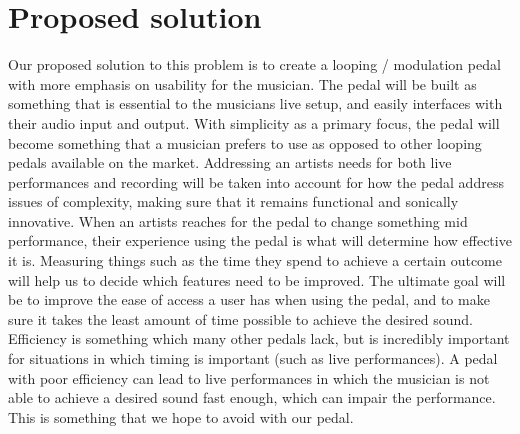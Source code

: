 \documentclass{article}
\begin{document}
\section{Proposed solution}
Our proposed solution to this problem is to create a looping / modulation pedal with more emphasis on usability for the musician. The pedal will be built as something that is essential to the musicians live setup, and easily interfaces with their audio input and output. With simplicity as a primary focus, the pedal will become something that a musician prefers to use as opposed to other looping pedals available on the market. Addressing an artists needs for both live performances and recording will be taken into account for how the pedal address issues of complexity, making sure that it remains functional and sonically innovative. When an artists reaches for the pedal to change something mid performance, their experience using the pedal is what will determine how effective it is. Measuring things such as the time they spend to achieve a certain outcome will help us to decide which features need to be improved. The ultimate goal will be to improve the ease of access a user has when using the pedal, and to make sure it takes the least amount of time possible to achieve the desired sound. Efficiency is something which many other pedals lack, but is incredibly important for situations in which timing is important (such as live performances). A pedal with poor efficiency can lead to live performances in which the musician is not able to achieve a desired sound fast enough, which can impair the performance. This is something that we hope to avoid with our pedal.
\end{document}
